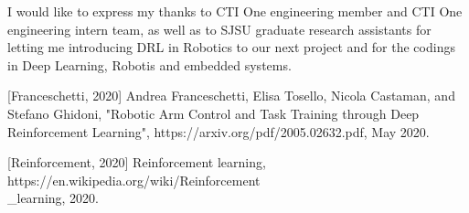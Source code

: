 \documentclass[conference]{IEEEtran}
\begin{document}
I would like to express my thanks to CTI One engineering member and 
CTI One engineering intern team, as well as to SJSU graduate research assistants 
for letting me introducing DRL in Robotics to our next project and for the 
codings in Deep Learning, Robotis and embedded systems. 
\begin{thebibliography}{1}

[Franceschetti, 2020] 
Andrea Franceschetti, Elisa Tosello, Nicola Castaman, and Stefano
Ghidoni, 
"Robotic Arm Control and Task Training
through Deep Reinforcement Learning", 
https://arxiv.org/pdf/2005.02632.pdf, May 2020. 

[Reinforcement, 2020] 
Reinforcement learning, 
https://en.wikipedia.org/wiki/Reinforcement \\ \_learning, 2020. 

\end{thebibliography}
 

\end{document}
